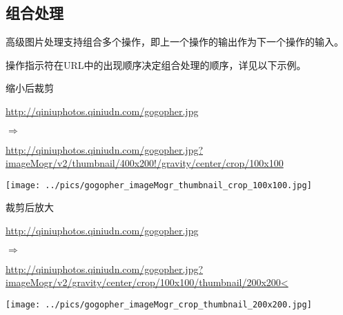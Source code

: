 \documentclass[11pt, oneside]{book}
\newcommand{\qpar}[1]{
\vspace{0.25em}
\noindent
#1\par
\vspace{0.25em}
}
\newcommand{\qurl}[1]{\footnotesize\url{#1}\normalsize}
\begin{document}
\begin{CJK*}{UTF8}{song}
\clearpage

\subsection{组合处理}

\qpar{高级图片处理支持组合多个操作，即上一个操作的输出作为下一个操作的输入。}
\qpar{操作指示符在URL中的出现顺序决定组合处理的顺序，详见以下示例。}

\begin{sample}
  \caption{缩小后裁剪}
    \qpar{\qurl{http://qiniuphotos.qiniudn.com/gogopher.jpg}}
    \qpar{$\Rightarrow$}
    \qpar{\qurl{http://qiniuphotos.qiniudn.com/gogopher.jpg?imageMogr/v2/thumbnail/400x200!/gravity/center/crop/100x100}}

    \begin{center}
      \texttt{[image: ../pics/gogopher\_imageMogr\_thumbnail\_crop\_100x100.jpg]}
    \end{center}
  \label{imageMogr-thumbnail-crop-100x100}
\end{sample}

\begin{sample}
  \caption{裁剪后放大}
    \qpar{\qurl{http://qiniuphotos.qiniudn.com/gogopher.jpg}}
    \qpar{$\Rightarrow$}
    \qpar{\qurl{http://qiniuphotos.qiniudn.com/gogopher.jpg?imageMogr/v2/gravity/center/crop/100x100/thumbnail/200x200<}}

    \begin{center}
      \texttt{[image: ../pics/gogopher\_imageMogr\_crop\_thumbnail\_200x200.jpg]}
    \end{center}
  \label{imageMogr-crop-thumbnail-200x200}
\end{sample}

%
%
%
%
%
%

\end{CJK*}
\end{document}
